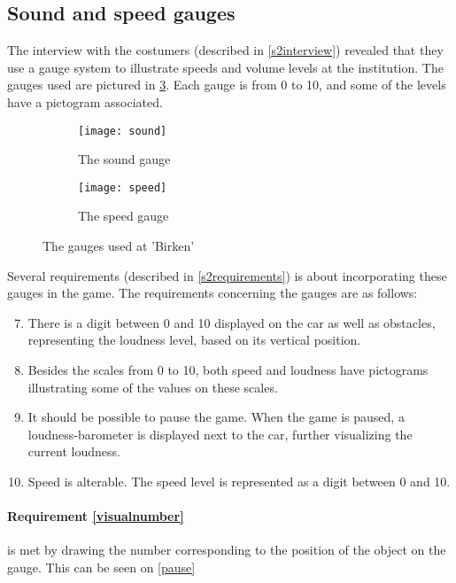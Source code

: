 \subsection{Sound and speed gauges}
The interview with the costumers (described in \cref{s2interview}) revealed that they use a gauge system to illustrate speeds and volume levels at the institution. 
The gauges used are pictured in \cref{gauges}.
Each gauge is from 0 to 10, and some of the levels have a pictogram associated.

\begin{figure}
	\centering
        \begin{subfigure}[b]{0.5\textwidth}
                \texttt{[image: sound]}
                \caption{The sound gauge}
                \label{soundgauge}
        \end{subfigure}%
        \begin{subfigure}[b]{0.5\textwidth}
                \texttt{[image: speed]}
                \caption{The speed gauge}
                \label{speedgauge}
        \end{subfigure}
        \caption{The gauges used at 'Birken'}\label{fig:animals}
        \label{gauges}
\end{figure}

Several requirements (described in \cref{s2requirements}) is about incorporating these gauges in the game.
The requirements concerning the gauges are as follows:

\begin{enumerate}
\setcounter{enumi}{6}
\item \label{visualnumber} There is a digit between 0 and 10 displayed on the car as well as obstacles, representing the loudness level, based on its vertical position. 
\item \label{pictogram} Besides the scales from 0 to 10, both speed and loudness have pictograms illustrating some of the values on these scales.
\item \label{pause} It should be possible to pause the game. When the game is paused, a loudness-barometer is displayed next to the car, further visualizing the current loudness.
\item \label{speeditem} Speed is alterable. The speed level is represented as a digit between 0 and 10.
\end{enumerate}


\paragraph{Requirement \ref{visualnumber}} is met by drawing the number corresponding to the position of the object on the gauge. 
This can be seen on \cref{pause}

